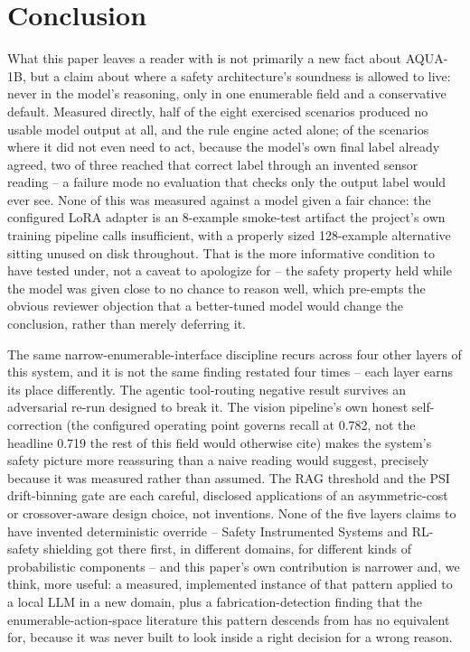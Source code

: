 \section{Conclusion}
\label{sec:conclusion}

What this paper leaves a reader with is not primarily a new fact about AQUA-1B, but a claim about
where a safety architecture's soundness is allowed to live: never in the model's reasoning, only in
one enumerable field and a conservative default. Measured directly, half of the eight exercised
scenarios produced no usable model output at all, and the rule engine acted alone; of the scenarios
where it did not even need to act, because the model's own final label already agreed, two of three
reached that correct label through an invented sensor reading -- a failure mode no evaluation that
checks only the output label would ever see. None of this was measured against a model given a fair
chance: the configured LoRA adapter is an 8-example smoke-test artifact the project's own training
pipeline calls insufficient, with a properly sized 128-example alternative sitting unused on disk
throughout. That is the more informative condition to have tested under, not a caveat to apologize
for -- the safety property held while the model was given close to no chance to reason well, which
pre-empts the obvious reviewer objection that a better-tuned model would change the conclusion,
rather than merely deferring it.

The same narrow-enumerable-interface discipline recurs across four other layers of this system,
and it is not the same finding restated four times -- each layer earns its place
differently. The agentic tool-routing negative result survives an adversarial re-run designed to
break it. The vision pipeline's own honest self-correction (the configured operating point governs
recall at 0.782, not the headline 0.719 the rest of this field would otherwise cite)
makes the system's safety picture more reassuring than a naive reading would suggest, precisely
because it was measured rather than assumed. The RAG threshold and the PSI drift-binning gate are
each careful, disclosed applications of an asymmetric-cost or crossover-aware design choice, not
inventions. None of the five layers claims to have invented deterministic override -- Safety
Instrumented Systems and RL-safety shielding got there first, in different domains, for different
kinds of probabilistic components -- and this paper's own contribution is narrower and, we think,
more useful: a measured, implemented instance of that pattern applied to a local LLM in a new domain,
plus a fabrication-detection finding that the enumerable-action-space literature this pattern
descends from has no equivalent for, because it was never built to look inside a right decision for
a wrong reason.

